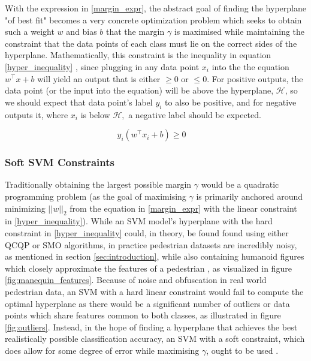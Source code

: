 With the expression in \ref{margin_expr}, the abstract goal of finding the hyperplane "of best fit" becomes a very concrete optimization problem which seeks to obtain such a weight $w$ and bias $b$ that the margin $\gamma$ is maximised while maintaining the constraint that the data points of each class must lie on the correct sides of the hyperplane. Mathematically, this constraint is the inequality in equation \ref{hyper_inequality} \cite{ng_support}, since plugging in any data point $x_i$ into the the equation $w^\top x +b$ will yield an output that is either $\ge 0$ or $\le 0$. For positive outputs, the data point (or the input into the equation) will be above the hyperplane, $\mathcal{H}$, so we should expect that data point's label $y_i$ to also be positive, and for negative outputs it, where $x_i$ is below $\mathcal{H},$ a negative label should be expected.

\begin{equation}\label{hyper_inequality}
y_{i}(w^\top x_{i}+b)\ge 0 \quad 
\end{equation}

\subsubsection{Soft SVM Constraints}\label{sec:soft_constraint_svm}

Traditionally obtaining the largest possible margin $\gamma$ would be a quadratic programming problem \cite{quadratic_programming} (as the goal of maximising $\gamma$ is primarily anchored around minimizing $||w||_{2}$ from the equation in \ref{margin_expr} with the linear constraint in \ref{hyper_inequality}). While an SVM model's hyperplane with the hard constraint in \ref{hyper_inequality} could, in theory, be found found using either QCQP \cite{cornell_svm_notes} or SMO \cite{chang_lin_2011_libsvm} algorithms, in practice pedestrian datasets are incredibly noisy, as mentioned in section \ref{sec:introduction}, while also containing humanoid figures which closely approximate the features of a pedestrian \cite{inria_improved}, as visualized in figure \ref{fig:manequin_features}. Because of noise and obfuscation in real world pedestrian data, an SVM with a hard linear constraint would fail to compute the optimal hyperplane as there would be a significant number of outliers or data points which share features common to both classes, as illustrated in figure \ref{fig:outliers}. Instead, in the hope of finding a hyperplane that achieves the best realistically possible classification accuracy, an SVM with a soft constraint, which does allow for some degree of error while maximising $\gamma$, ought to be used \cite{dalal_2005_histograms} \cite{cornell_svm_continued}.

